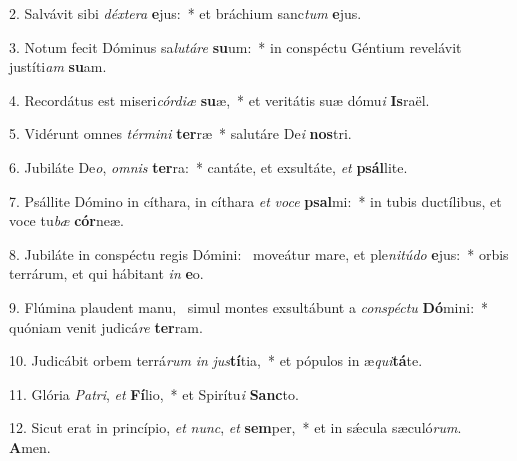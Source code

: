 2. Salvávit sibi \textit{déx}\textit{te}\textit{ra} \textbf{e}jus:~*  et bráchium sanc\textit{tum} \textbf{e}jus.\

3. Notum fecit Dóminus sa\textit{lu}\textit{tá}\textit{re} \textbf{su}um:~*  in conspéctu Géntium revelávit justíti\textit{am} \textbf{su}am.\

4. Recordátus est miseri\textit{cór}\textit{di}\textit{æ} \textbf{su}æ,~*  et veritátis suæ dómu\textit{i} \textbf{Is}raël.\

5. Vidérunt omnes \textit{tér}\textit{mi}\textit{ni} \textbf{ter}ræ~*  salutáre De\textit{i} \textbf{nos}tri.\

6. Jubiláte De\textit{o}, \textit{om}\textit{nis} \textbf{ter}ra:~*  cantáte, et exsultáte, \textit{et} \textbf{psál}lite.\

7. Psállite Dómino in cíthara, in cíthara \textit{et} \textit{vo}\textit{ce} \textbf{psal}mi:~*  in tubis ductílibus, et voce tu\textit{bæ} \textbf{cór}neæ.\

8. Jubiláte in conspéctu regis Dómini: \dag\  moveátur mare, et ple\textit{ni}\textit{tú}\textit{do} \textbf{e}jus:~*  orbis terrárum, et qui hábitant \textit{in} \textbf{e}o.\

9. Flúmina plaudent manu, \dag\  simul montes exsultábunt a \textit{con}\textit{spéc}\textit{tu} \textbf{Dó}mini:~*  quóniam venit judicá\textit{re} \textbf{ter}ram.\

10. Judicábit orbem terrá\textit{rum} \textit{in} \textit{jus}\textbf{tí}tia,~*  et pópulos in æ\textit{qui}\textbf{tá}te.\

11. Glória \textit{Pa}\textit{tri}, \textit{et} \textbf{Fí}lio,~*  et Spirítu\textit{i} \textbf{Sanc}to.\

12. Sicut erat in princípio, \textit{et} \textit{nunc}, \textit{et} \textbf{sem}per,~*  et in sǽcula sæculó\textit{rum}. \textbf{A}men.\

